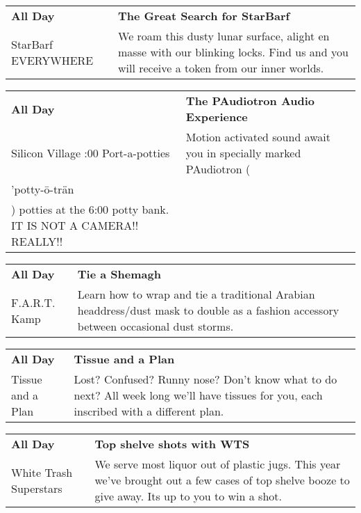 \begin{tabular}{ p{1in} p{2.2in} }
    \textbf{All Day} & \textbf{The Great Search for StarBarf} \\
    StarBarf \newline EVERYWHERE & We roam this dusty lunar surface, alight en masse with our blinking locks. Find us and you will receive a token from our inner worlds. \\
    \hline 
\end{tabular}
    
\begin{tabular}{ p{1in} p{2.2in} }
    \textbf{All Day} & \textbf{The PAudiotron Audio Experience} \\
    Silicon Village \newline 6:00 Port-a-potties & Motion activated sound await you in specially marked PAudiotron (\\'potty-\=o-tr\"an\\) potties at the 6:00 potty bank.  IT IS NOT A CAMERA!!  REALLY!! \\
    \hline 
\end{tabular}
    
\begin{tabular}{ p{1in} p{2.2in} }
    \textbf{All Day} & \textbf{Tie a Shemagh} \\
    F.A.R.T. Kamp \newline  & Learn how to wrap and tie a traditional Arabian headdress/dust mask to double as a fashion accessory between occasional dust storms. \\
    \hline 
\end{tabular}
    
\begin{tabular}{ p{1in} p{2.2in} }
    \textbf{All Day} & \textbf{Tissue and a Plan} \\
    Tissue and a Plan \newline  & Lost? Confused? Runny nose? Don't know what to do next? All week long we'll have tissues for you, each inscribed with a different plan. \\
    \hline 
\end{tabular}
    
\begin{tabular}{ p{1in} p{2.2in} }
    \textbf{All Day} & \textbf{Top shelve shots with WTS} \\
    White Trash Superstars \newline  & We serve most liquor out of plastic jugs. This year we've brought out a few cases of top shelve booze to give away. Its up to you to win a shot. \\
    \hline 
\end{tabular}
    
